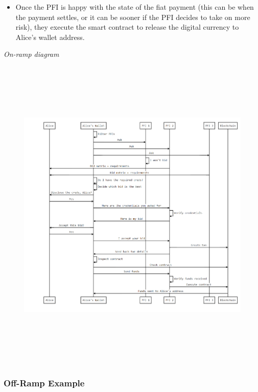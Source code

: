 \documentclass[11pt]{article}
\begin{document}
\begin{itemize}
	\item Once the PFI is happy with the state of the fiat payment (this can be when the payment settles, or it can be sooner if the PFI decides to take on more risk), they execute the smart contract to release the digital currency to Alice’s wallet address.

\vspace{1\baselineskip}
\end{itemize}
\begin{center}
\textit{On-ramp diagram}
\end{center}


\vspace{1\baselineskip}
\begin{figure}[H]
\centering
\includegraphics[width=16.4cm,height=15.3cm]{./diagrams/on-ramp.png}
\end{figure}


\subsubsection{Off-Ramp Example}
\end{document}
